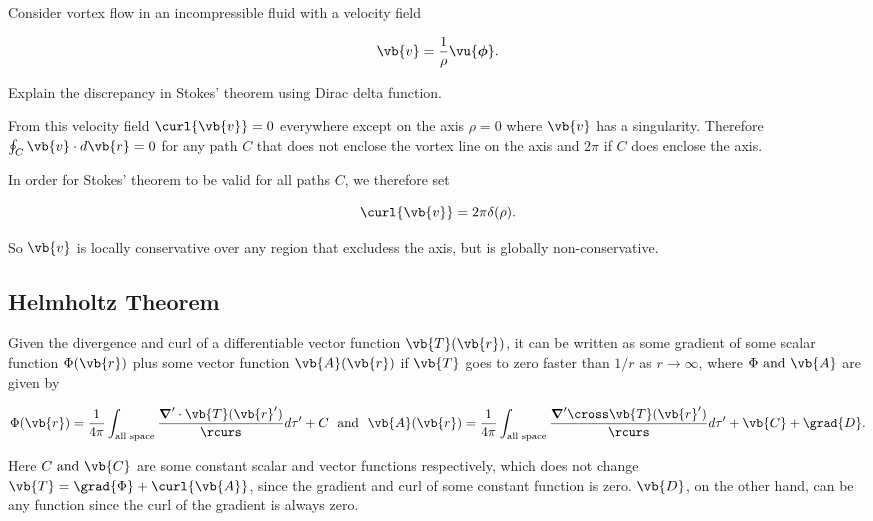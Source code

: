 \documentclass[english,a4paper,12pt]{report}
\begin{document}
{Consider vortex flow in an incompressible fluid with a velocity field

\begin{equation}
	\vb{v} = \frac{1}{\rho } \vu{\boldsymbol{\phi } }. 
\end{equation}

Explain the discrepancy in Stokes' theorem using Dirac delta function.
}
{From this velocity field \(\curl{\vb{v} } =0\) everywhere except on the axis \(\rho =0\) where \(\vb{v}\) has a singularity. Therefore \( \oint_{C} \vb{v} \cdot d\vb{r} =0\) for any path \(C\) that does not enclose the vortex line on the axis and \(2\pi \) if \(C\) does enclose the axis.

In order for Stokes' theorem to be valid for all paths \(C\), we therefore set 

\begin{equation}
	\curl{\vb{v} } = 2\pi \delta (\rho ).
\end{equation}

So \(\vb{v} \) is locally conservative over any region that excludess the axis, but is globally non-conservative. 

} 


	
\subsection{Helmholtz Theorem}

\begin{theorem}
Given the divergence and curl of a differentiable vector function \(\vb{T}(\vb{r} ) \), it can be written as some gradient of some scalar function \(\Phi(\vb{r} ) \) plus some vector function \(\vb{A}(\vb{r} ) \) if \(\vb{T} \) goes to zero faster than \(1 /r \) as \(r \to \infty\), where \(\Phi \text { and } \vb{A} \) are given by

\begin{equation}
	\Phi(\vb{r} ) = \frac{1}{4\pi } \int_{\text{all space} } \frac{\boldsymbol{\nabla}' \cdot \vb{T} (\vb{r} ')}{\rcurs } d\tau ' + C~\text { and }~ \vb{A} (\vb{r} ) = \frac{1}{4\pi } \int_{\text{all space} } \frac{\boldsymbol{\nabla}' \cross \vb{T} (\vb{r} ')}{\rcurs } d\tau ' + \vb{C} + \grad{D} .
\end{equation}

Here \(C \text { and }  \vb{C} \) are some constant scalar and vector functions respectively, which does not change \(\vb{T} = \grad{\Phi } + \curl{\vb{A} }\), since the gradient and curl of some constant function is zero. \(\vb{D}\), on the other hand, can be any function since the curl of the gradient is always zero. 

\end{theorem}
\end{document}
